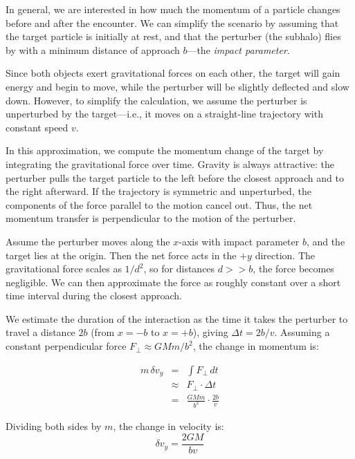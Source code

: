         In general, we are interested in how much the momentum of a particle changes before and after the encounter. We can simplify the scenario by assuming that the target particle is initially at rest, and that the perturber (the subhalo) flies by with a minimum distance of approach $b$—the \emph{impact parameter}.

        Since both objects exert gravitational forces on each other, the target will gain energy and begin to move, while the perturber will be slightly deflected and slow down. However, to simplify the calculation, we assume the perturber is unperturbed by the target—i.e., it moves on a straight-line trajectory with constant speed $v$.

        In this approximation, we compute the momentum change of the target by integrating the gravitational force over time. Gravity is always attractive: the perturber pulls the target particle to the left before the closest approach and to the right afterward. If the trajectory is symmetric and unperturbed, the components of the force parallel to the motion cancel out. Thus, the net momentum transfer is perpendicular to the motion of the perturber.

        Assume the perturber moves along the $x$-axis with impact parameter $b$, and the target lies at the origin. Then the net force acts in the $+y$ direction. The gravitational force scales as $1/d^2$, so for distances $d >> b$, the force becomes negligible. We can then approximate the force as roughly constant over a short time interval during the closest approach.

        We estimate the duration of the interaction as the time it takes the perturber to travel a distance $2b$ (from $x = -b$ to $x = +b$), giving $\Delta t = 2b/v$. Assuming a constant perpendicular force $F_\perp \approx GMm/b^2$, the change in momentum is:

        \begin{eqnarray}
        m\,\delta v_y &=& \int F_\perp \, dt \\
                    &\approx& F_\perp \cdot \Delta t \\
                    &=& \frac{GMm}{b^2} \cdot \frac{2b}{v}
        \end{eqnarray}

        Dividing both sides by $m$, the change in velocity is:
        \begin{equation}\label{eq:delta_v_impulse_approx}
        \delta v_y = \frac{2GM}{b v}
        \end{equation}


